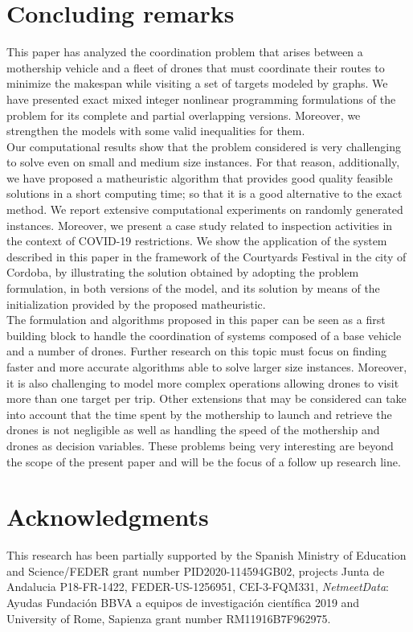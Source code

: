 \documentclass[10pt,a4paper]{elsarticle}
\newcommand{\EN}[1]{{\color{black}#1}}
\begin{document}
\section{Concluding remarks\label{section:CR}}
\noindent
This paper has analyzed the coordination problem that arises between a mothership vehicle and a fleet of drones that must coordinate their routes to minimize the makespan while visiting a set of targets modeled by graphs. We have presented exact mixed integer nonlinear programming formulations of the problem for its complete and partial overlapping versions. Moreover, we strengthen the models with some valid inequalities for them.\\
Our computational results show that the \EN{problem considered} is very challenging to solve even on small and medium size instances. For that reason, additionally, we have proposed a matheuristic algorithm that provides good quality feasible solutions in a short computing time; so that it is a good alternative to the exact method. We report extensive computational experiments on randomly generated instances. Moreover, we present a case study related to inspection activities in the context of COVID-19 restrictions. We show the application of the system described in this paper in the framework of the Courtyard\EN{s} Festival in the city of Cordoba, by illustrating the solution obtained by adopting the problem formulation, in both versions of the model, and its solution by means of the initialization provided by the proposed matheuristic.\\
\noindent
The formulation and algorithms proposed in this paper can be seen as a first building block to handle the coordination of systems composed \EN{of} a base vehicle and a number of  drones. Further research \EN{on} this topic must focus on finding faster and more accurate algorithms able to solve larger size instances. Moreover, it is also challenging to model more complex operations allowing \EN{drones to visit} more than one target per trip. Other extensions that may be considered can take into account that the time spent by the mothership to launch and retrieve the drones is not negligible as well as handling the speed of the mothership and drones as decision variables. These problems being very interesting are beyond the scope of the present paper and will be the focus of a follow up research line.
\section*{Acknowledgments}
This research has been partially supported by \EN{the} Spanish Ministry of Education and Science/FEDER grant number  PID2020-114594GB02, projects Junta de Andalucia P18-FR-1422, FEDER-US-1256951, CEI-3-FQM331, \textit{NetmeetData}: Ayudas Fundaci\'on BBVA a equipos de investigaci\'on cient\'ifica 2019 and University of Rome, Sapienza grant number RM11916B7F962975.
\end{document}
